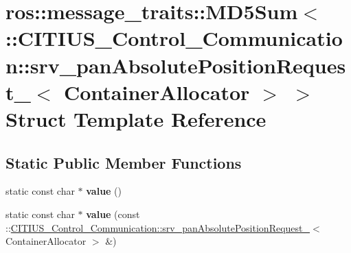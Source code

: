 \hypertarget{structros_1_1message__traits_1_1_m_d5_sum_3_01_1_1_c_i_t_i_u_s___control___communication_1_1srv_a1e4ccef8a181c5bbee087481556a5a1}{\section{ros\-:\-:message\-\_\-traits\-:\-:\-M\-D5\-Sum$<$ \-:\-:\-C\-I\-T\-I\-U\-S\-\_\-\-Control\-\_\-\-Communication\-:\-:srv\-\_\-pan\-Absolute\-Position\-Request\-\_\-$<$ \-Container\-Allocator $>$ $>$ \-Struct \-Template \-Reference}
\label{structros_1_1message__traits_1_1_m_d5_sum_3_01_1_1_c_i_t_i_u_s___control___communication_1_1srv_a1e4ccef8a181c5bbee087481556a5a1}
}
\subsection*{\-Static \-Public \-Member \-Functions}
\begin{DoxyCompactItemize}
\item 
\hypertarget{structros_1_1message__traits_1_1_m_d5_sum_3_01_1_1_c_i_t_i_u_s___control___communication_1_1srv_a1e4ccef8a181c5bbee087481556a5a1_a6629f161565edd2a6e48a8fd3207d2e2}{static const char $\ast$ {\bfseries value} ()}\label{structros_1_1message__traits_1_1_m_d5_sum_3_01_1_1_c_i_t_i_u_s___control___communication_1_1srv_a1e4ccef8a181c5bbee087481556a5a1_a6629f161565edd2a6e48a8fd3207d2e2}

\item 
\hypertarget{structros_1_1message__traits_1_1_m_d5_sum_3_01_1_1_c_i_t_i_u_s___control___communication_1_1srv_a1e4ccef8a181c5bbee087481556a5a1_a413243e4a4d48465f1bae9a3a6c6b3f2}{static const char $\ast$ {\bfseries value} (const \-::\hyperlink{struct_c_i_t_i_u_s___control___communication_1_1srv__pan_absolute_position_request__}{\-C\-I\-T\-I\-U\-S\-\_\-\-Control\-\_\-\-Communication\-::srv\-\_\-pan\-Absolute\-Position\-Request\-\_\-}$<$ \-Container\-Allocator $>$ \&)}\label{structros_1_1message__traits_1_1_m_d5_sum_3_01_1_1_c_i_t_i_u_s___control___communication_1_1srv_a1e4ccef8a181c5bbee087481556a5a1_a413243e4a4d48465f1bae9a3a6c6b3f2}

\end{DoxyCompactItemize}
